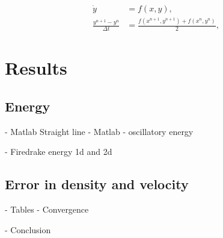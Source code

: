 \documentclass[a4paper,11pt]{article}
\begin{document}
\begin{equation} \begin{aligned} \dot {y} &= f(x,y),\\
\frac{y^{n+1}- y^n}{\Delta t} &= \frac{ f(x^{n+1}, y^{n+1}) + f(x^n, y^n)}{2}, \end{aligned}\end{equation}
%
%
%
%


\section{Results}

\subsection{Energy}

- Matlab Straight line
- Matlab - oscillatory energy

- Firedrake energy 1d and 2d

\subsection{ Error in density and velocity}

 - Tables
 - Convergence
 
 - Conclusion
\end{document}
